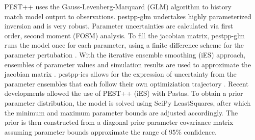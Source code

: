 \documentclass[17pt, a0paper, margin=0mm, innermargin=5mm, blockverticalspace=5mm, colspace=5mm, subcolspace=-15mm]{tikzposter}
\begin{document}
\begin{columns}
{
\begin{multicols}{2}
    PEST++ uses the Gauss-Levenberg-Marquard (GLM) algorithm to history match model output to observations. pestpp-glm undertakes highly parameterized inversion and is very robust. Parameter uncertainties are calculated via first order, second moment (FOSM) analysis. To fill the jacobian matrix, pestpp-glm runs the model once for each parameter, using a finite difference scheme for the parameter pertubation \citep{White2020}.
    With the iterative ensemble smoothing (iES) approach, ensembles of parameter values and simulation results are used to approximate the jacobian matrix \citep{White2018}. pestpp-ies allows for the expression of uncertainty from the parameter ensembles that each follow their own optimiziation trajectory \citep{Fienen2024}. 
    Recent developments \citep[e.g.][]{GroundwaterModelingChallenge2024} allowed the use of PEST++ (iES) with Pastas. To obtain a prior parameter distribution, the model is solved using SciPy LeastSquares, after which the minimum and maximum parameter bounds are adjusted accordingly. The prior is then constructed from a diagonal prior parameter covariance matrix assuming parameter bounds approximate the range of 95\% confidence.
\end{multicols}
\vspace{-4mm}
}
\end{columns}
\end{document}
